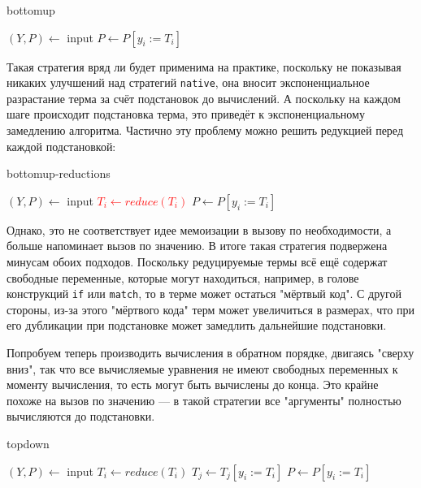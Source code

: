 \documentclass[../thesis.tex]{subfiles}
\begin{document}
\begin{megaalgorithm}
    \caption{bottomup}
  \begin{algorithmic}
    \State $(Y, P)\gets$ input
        \State $P \gets P [y_i := T_i]$
    \EndFor
    \State {}
  \end{algorithmic}
\end{megaalgorithm}

Такая стратегия вряд ли будет применима на практике, поскольку не показывая никаких улучшений над стратегий \texttt{native}, она вносит экспоненциальное разрастание терма за счёт подстановок до вычислений. А поскольку на каждом шаге происходит подстановка терма, это приведёт к экспоненциальному замедлению алгоритма. Частично эту проблему можно решить редукцией перед каждой подстановкой:

\begin{megaalgorithm}
    \caption{bottomup-reductions}
  \begin{algorithmic}
    \State $(Y, P)\gets$ input
        \State \textcolor{red}{$T_i \gets reduce(T_i)$}
        \State $P \gets P [y_i := T_i]$
    \EndFor
    \State {}
  \end{algorithmic}
\end{megaalgorithm}

Однако, это не соответствует идее мемоизации в вызову по необходимости, а больше напоминает вызов по значению. В итоге такая стратегия подвержена минусам обоих подходов. Поскольку редуцируемые термы всё ещё содержат свободные переменные, которые могут находиться, например, в голове конструкций \texttt{if} или \texttt{match}, то в терме может остаться "мёртвый код". С другой стороны, из-за этого "мёртвого кода" терм может увеличиться в размерах, что при его дубликации при подстановке может замедлить дальнейшие подстановки.

Попробуем теперь производить вычисления в обратном порядке, двигаясь "сверху вниз", так что все вычисляемые уравнения не имеют свободных переменных к моменту вычисления, то есть могут быть вычислены до конца. Это крайне похоже на вызов по значению --- в такой стратегии все "аргументы" полностью вычисляются до подстановки.

\begin{megaalgorithm}
    \caption{topdown}
  \begin{algorithmic}
    \State $(Y, P)\gets$ input
        \State $T_i \gets reduce(T_i)$
            \State $T_j \gets T_j [y_i := T_i]$
        \EndFor
        \State $P \gets P [y_i := T_i]$
    \EndFor
    \State {}
  \end{algorithmic}
\end{megaalgorithm} 
\end{document}
